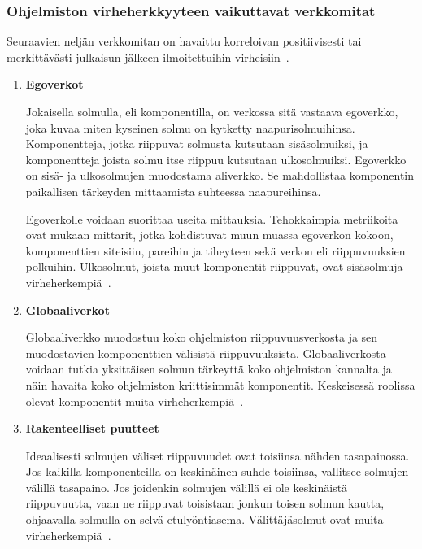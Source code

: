 \documentclass[finnish]{../tktltiki2}
\theoremstyle{definition}
\theoremstyle{remark}
\begin{document}
\subsubsection{Ohjelmiston virheherkkyyteen vaikuttavat verkkomitat}

    Seuraavien neljän verkkomitan on havaittu korreloivan positiivisesti tai merkittävästi julkaisun jälkeen 
ilmoitettuihin virheisiin~\cite{ZN08}.

\begin{enumerate}
    
    \item {\bf Egoverkot}
    
    Jokaisella solmulla, eli komponentilla, on verkossa sitä vastaava egoverkko, joka kuvaa miten kyseinen solmu on 
    kytketty naapurisolmuihinsa. Komponentteja, jotka riippuvat solmusta kutsutaan sisäsolmuiksi, ja komponentteja 
    joista solmu itse riippuu kutsutaan ulkosolmuiksi. Egoverkko on sisä- ja ulkosolmujen muodostama aliverkko. Se 
    mahdollistaa komponentin paikallisen tärkeyden mittaamista suhteessa naapureihinsa.
    
    Egoverkolle voidaan suorittaa useita mittauksia. Tehokkaimpia metriikoita ovat mukaan mittarit, jotka kohdistuvat 
    muun muassa egoverkon kokoon, komponenttien siteisiin, pareihin ja tiheyteen sekä verkon eli riippuvuuksien 
    polkuihin. Ulkosolmut, joista muut komponentit riippuvat, ovat sisäsolmuja virheherkempiä~\cite{ZN08}.
        
    \item {\bf Globaaliverkot}
    
    Globaaliverkko muodostuu koko ohjelmiston riippuvuusverkosta ja sen muodostavien komponenttien välisistä 
    riippuvuuksista. Globaaliverkosta voidaan tutkia yksittäisen solmun tärkeyttä koko ohjelmiston kannalta ja näin 
    havaita koko ohjelmiston kriittisimmät komponentit. Keskeisessä roolissa olevat komponentit muita 
    virheherkempiä~\cite{ZN08}.
    
    \item {\bf Rakenteelliset puutteet}
    
    Ideaalisesti solmujen väliset riippuvuudet ovat toisiinsa nähden tasapainossa. Jos kaikilla komponenteilla on 
    keskinäinen suhde toisiinsa, vallitsee solmujen välillä tasapaino. Jos joidenkin solmujen välillä ei ole keskinäistä 
    riippuvuutta, vaan ne riippuvat toisistaan jonkun toisen solmun kautta, ohjaavalla solmulla on selvä etulyöntiasema. 
    Välittäjäsolmut ovat muita virheherkempiä~\cite{ZN08}.
    

\end{enumerate}
\end{document}
